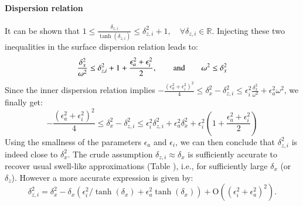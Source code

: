 \paragraph{Dispersion relation}
%
It can be shown that $\displaystyle 1\le \frac{\delta_{z,i}}{\tanh(\delta_{z,i})}\le \delta_{z,i}^2+1, \quad \forall \delta_{z,i}\in\mathbb{R}$. Injecting these two inequalities in the surface dispersion relation leads to:
\[
\frac{\delta_x^2}{\omega^2}\le \delta_{z,i}^2+1+\frac{\epsilon_a^2+\epsilon_i^2}{2}, \qquad \hbox{and}\qquad \omega^2 \le \delta_x^2
\]
%
Since the inner dispersion relation implies 
$\displaystyle
-\frac{(\epsilon_a^2+\epsilon_i^2)^2}{4}\le \delta_x^2 - \delta_{z,i}^2 
\le \epsilon_i^2\frac{\delta_x^2}
{\omega^2}+\epsilon_a^2\omega^2$, we finally get:
%
\[
-\frac{(\epsilon_a^2+\epsilon_i^2)^2}{4}\le \delta_x^2 - \delta_{z,i}^2 
\le \epsilon_i^2 \delta_{z,i}^2+\epsilon_a^2\delta_x^2
+\epsilon_i^2\left(1+\frac{\epsilon_a^2+\epsilon_i^2}{2}\right)
\]
%
Using the smallness of the parameters $\epsilon_a$ and $\epsilon_i$, we can then conclude that $\delta_{z,i}^2$ is indeed close to $\delta_x^2$. 
%
The crude  assumption $\delta_{z,i} \approx \delta_x$ is sufficiently accurate to recover usual swell-like approximations (Table ), i.e., for sufficiently large $\delta_x$ (or $\delta_z$). However a more accurate expression is given by:
%
\begin{equation}
\delta_{z,i}^2=\delta_x^2
-\delta_x\left(
\epsilon_i^2/\tanh(\delta_x)+\epsilon_a^2\tanh(\delta_x)
\right)
+\mathrm{O}	((\epsilon_i^2+\epsilon_a^2)^2).
\label{longMSW}
\end{equation}

